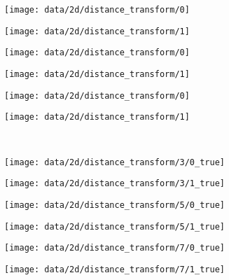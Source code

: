 \begin{figure}
  \centering
  \begin{subfigure}[t]{0.12\textwidth}
    \texttt{[image: data/2d/distance\_transform/0]}
  \end{subfigure}
  \begin{subfigure}[t]{0.12\textwidth}
    \texttt{[image: data/2d/distance\_transform/1]}
  \end{subfigure}\hspace{0.5cm}
  \begin{subfigure}[t]{0.12\textwidth}
    \texttt{[image: data/2d/distance\_transform/0]}
  \end{subfigure}
  \begin{subfigure}[t]{0.12\textwidth}
    \texttt{[image: data/2d/distance\_transform/1]}
  \end{subfigure}\hspace{0.5cm}
  \begin{subfigure}[t]{0.12\textwidth}
    \texttt{[image: data/2d/distance\_transform/0]}
  \end{subfigure}
  \begin{subfigure}[t]{0.12\textwidth}
    \texttt{[image: data/2d/distance\_transform/1]}
  \end{subfigure}\\
  
  \begin{subfigure}[t]{0.12\textwidth}
    \texttt{[image: data/2d/distance\_transform/3/0\_true]}
  \end{subfigure}
  \begin{subfigure}[t]{0.12\textwidth}
    \texttt{[image: data/2d/distance\_transform/3/1\_true]}
  \end{subfigure}\hspace{0.5cm}
  \begin{subfigure}[t]{0.12\textwidth}
    \texttt{[image: data/2d/distance\_transform/5/0\_true]}
  \end{subfigure}
  \begin{subfigure}[t]{0.12\textwidth}
    \texttt{[image: data/2d/distance\_transform/5/1\_true]}
  \end{subfigure}\hspace{0.5cm}
  \begin{subfigure}[t]{0.12\textwidth}
    \texttt{[image: data/2d/distance\_transform/7/0\_true]}
  \end{subfigure}
  \begin{subfigure}[t]{0.12\textwidth}
    \texttt{[image: data/2d/distance\_transform/7/1\_true]}
  \end{subfigure}\\
  

\end{figure}
